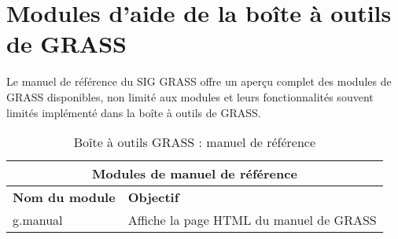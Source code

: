 \section{Modules d'aide de la boîte à outils de GRASS}

Le manuel de référence du SIG GRASS offre un aperçu complet des modules de GRASS disponibles, non limité aux modules et leurs fonctionnalités souvent limités implémenté dans la boîte à outils de GRASS.

\begin{table}[H]
\centering
 \begin{tabular}{|p{4cm}|p{10cm}|}
  \hline \multicolumn{2}{|c|}{\textbf{Modules de manuel de référence}}\\
  \hline \textbf{Nom du module} & \textbf{Objectif} \\
  \hline g.manual & Affiche la page HTML du manuel de GRASS \\
\hline
\end{tabular}
\caption{Boîte à outils GRASS : manuel de référence}
\end{table}
